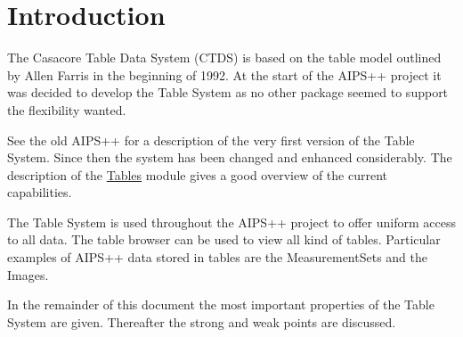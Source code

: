 \section{Introduction}
The Casacore Table Data System (CTDS) is based on the table model outlined
by Allen Farris in the beginning of 1992. At the start of the AIPS++
project it was decided to develop the Table System as no other package
seemed to support the flexibility wanted.

See the old AIPS++
for a description of the very first version of the Table System.
Since then the system has been changed and enhanced considerably.
The description of the
\href{../html/group__Tables__module.html}{Tables}
module gives a good overview of the current capabilities.

The Table System is used throughout the AIPS++ project to offer
uniform access to all data. The table browser can be used to view
all kind of tables.
Particular examples of AIPS++ data stored
in tables are the MeasurementSets and the Images.

In the remainder of this document the most important properties of the
Table System are given. Thereafter the strong and weak points are
discussed. 

